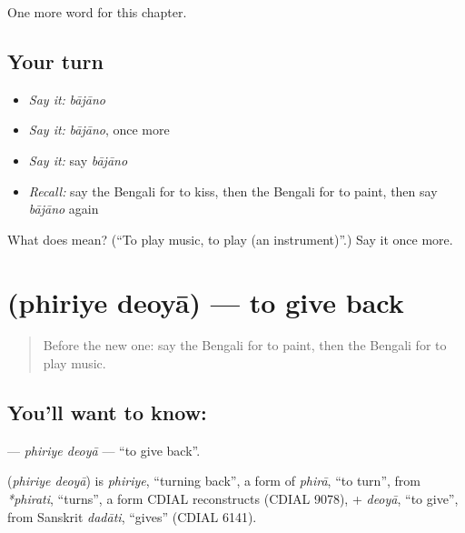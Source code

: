 \begin{grammarlens}[title={What you've built}]
One more word for this chapter.
\end{grammarlens}

\subsection*{Your turn}
\begin{itemize}
\raggedright
  \item \emph{Say it:} \emph{bājāno}
  \item \emph{Say it:} \emph{bājāno}, once more
  \item \emph{Say it:} say \emph{bājāno}
  \item \emph{Recall:} say the Bengali for to kiss, then the Bengali for to paint, then say \emph{bājāno} again
\end{itemize}

\begin{tcolorbox}[breakable,colback=teal!4,colframe=teal!35!black,title={Before you move on}]
What does  mean? (\textquotedblleft{}To play music, to play (an instrument)\textquotedblright{}.) Say it once more.
\end{tcolorbox}
\section[\texorpdfstring{\bn{ফিরিয়ে} \bn{দেওয়া} (phiriye deoyā)}{ফিরিয়ে দেওয়া (phiriye deoyā)}]{  (phiriye deoyā) — to give back}

\label{lesson:BN-C239-phiriye-deoya}



\begin{quote}
Before the new one: say the Bengali for to paint, then the Bengali for to play music.
\end{quote}

\subsection*{You'll want to know:  }
\textbf{ } — \emph{phiriye deoyā} — \textquotedblleft{}to give back\textquotedblright{}.

\begin{cousinweb}
\textbf{ } (\emph{phiriye deoyā}) is \emph{phiriye}, \textquotedblleft{}turning back\textquotedblright{}, a form of \emph{phirā}, \textquotedblleft{}to turn\textquotedblright{}, from \emph{*phirati}, \textquotedblleft{}turns\textquotedblright{}, a form CDIAL reconstructs (CDIAL 9078), + \emph{deoyā}, \textquotedblleft{}to give\textquotedblright{}, from Sanskrit \emph{dadāti}, \textquotedblleft{}gives\textquotedblright{} (CDIAL 6141).
\end{cousinweb}

